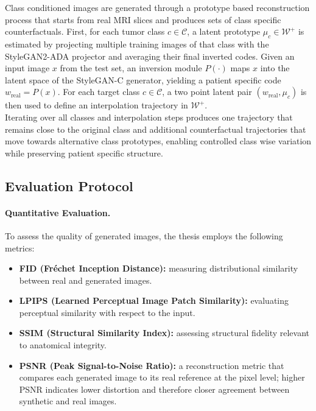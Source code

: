 Class conditioned images are generated through a prototype based reconstruction process that starts from real MRI slices and produces sets of class specific counterfactuals. First, for each tumor class \(c \in \mathcal{C}\), a latent prototype \(\mu_c \in \mathcal{W}^+\) is estimated by projecting multiple training images of that class with the StyleGAN2-ADA \cite{Karras2019stylegan2} projector and averaging their final inverted codes. Given an input image \(x\) from the test set, an inversion module \(P(\cdot)\) maps \(x\) into the latent space of the StyleGAN-C generator, yielding a patient specific code \(w_{\text{real}} = P(x)\). For each target class \(c \in \mathcal{C}\), a two point latent pair \((w_{\text{real}}, \mu_c)\) is then used to define an interpolation trajectory in \(\mathcal{W}^+\). \\

Iterating over all classes and interpolation steps produces one trajectory that remains close to the original class and additional counterfactual trajectories that move towards alternative class prototypes, enabling controlled class wise variation while preserving patient specific structure.


\subsection{Evaluation Protocol}
\label{subsec:evaluation_protocol}

\paragraph{Quantitative Evaluation.}
To assess the quality of generated images, the thesis employs the following metrics:
\begin{itemize}
    \item \textbf{FID (Fréchet Inception Distance):} measuring distributional similarity between real and generated images.
    \item \textbf{LPIPS (Learned Perceptual Image Patch Similarity):} evaluating perceptual similarity with respect to the input.
    \item \textbf{SSIM (Structural Similarity Index):} assessing structural fidelity relevant to anatomical integrity.
    \item \textbf{PSNR (Peak Signal-to-Noise Ratio):} a reconstruction metric that compares each generated image to its real reference at the pixel level; higher PSNR indicates lower distortion and therefore closer agreement between synthetic and real images.
\end{itemize}

